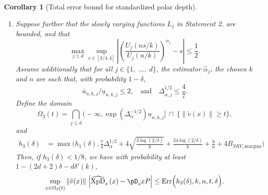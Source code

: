 \documentclass{article}
\makeatletter
\numberwithin{equation}{section}
\newtheorem{corollary}{Corollary}[section]
\renewcommand{\P}{\mathbb{P}}
\newcommand{\as}[1]{}%
\newcommand{\PP}{\P}%
\newcommand{\XpDsymbol}{\mathrm{XpD}}  %
\newcommand{\coDs}[2]{\pD_s{#1}{#2}}
\newcommand{\hatcoDs}[1]{\widehat{\XpDsymbol}_s\left({#1}\right)}
\makeatother
\begin{document}
\begin{corollary}[Total error bound for standardized polar depth]
\begin{enumerate}
\item Suppose further that the slowly varying functions $L_j$ in
  Statement 2. are bounded, and that  
  $$
\max_{j\le d}    \sup_{s\in[3/4,4]}{\left|\left(\frac{U_j(ns/k)}{U_j(n/k)}\right)^{\alpha_j}-s\right|}\leq
                \frac{1}{2}.
                $$
                Assume additionally  that for all $j\in\{1,\; \ldots,\; d\}$,  the estimator $\hat \alpha_j$, the chosen $k$ and $n$ are such that,  with probability $1-\delta$, 
                $$
                \overline u_{n,k,j} /\underline u_{n,k,j} \le 2, \textrm{~~~and~~~}
        \Delta_{\alpha,j}^{1/2}\leq \frac{4}{7}.            %
$$
  Define the domain %
  $$
\Omega_3(t) = \bigcap_{j\le d} \Big( - \infty,  \exp{\left(\Delta_\alpha^{-1/2 }\right)}\underline{u}_{n,k,j} \Big]~\cap~\{\|\tilde v(x)\|\ge t\}, 
$$
and
  \begin{align*}
    h_{3}(\delta)
    &= \max\Bigg(h_1(\delta),   \frac{7}{4} \Delta_{\alpha}^{1/2} +
                4\sqrt{\frac{3\log(2/\delta)}{k}} +
                \frac{24\log(2/\delta)}{k} + \frac{8}{n} + 4B_{SRV,\textrm{margins}}   \Bigg)
  \end{align*}
  Then, if $h_3(\delta)<1/8$, we have with probability at least $ 1 - (2d+2)\delta - d  \delta'(k)$, %
$$
  \sup_{ x \in \Omega_3(t)}  \|\tilde v(x)\|~\Big| \hatcoDs{x} - \coDs{x}{P} \Big| \le \mathrm{Err}\Big(h_3(\delta), k,n,t,\delta\Big).  
  $$
  
 
\end{enumerate}

\end{corollary}
\end{document}
